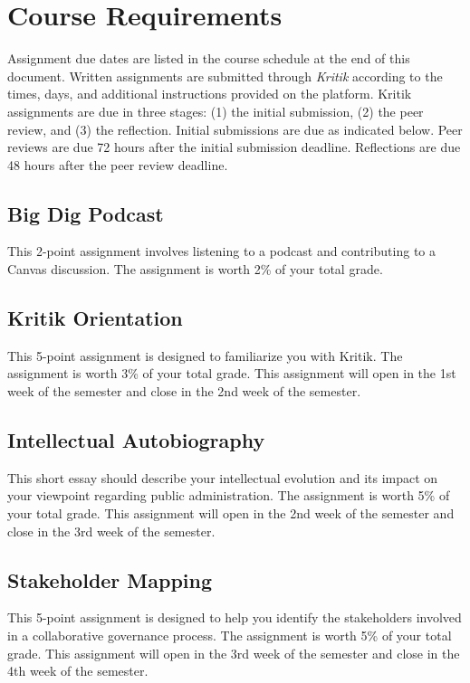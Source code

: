 \documentclass[12pt, letterpaper]{article}
\begin{document}
\section*{Course Requirements}

Assignment due dates are listed in the course schedule at the end of this document. Written assignments are submitted through \emph{Kritik} according to the times, days, and additional instructions provided on the platform. Kritik assignments are due in three stages: (1) the initial submission, (2) the peer review, and (3) the reflection. Initial submissions are due as indicated below. Peer reviews are due 72 hours after the initial submission deadline. Reflections are due 48 hours after the peer review deadline.

\subsection*{Big Dig Podcast}

This 2-point assignment involves listening to a podcast and contributing to a Canvas discussion. The assignment is worth 2\% of your total grade.

\subsection*{Kritik Orientation}

This 5-point assignment is designed to familiarize you with Kritik. The assignment is worth 3\% of your total grade. This assignment will open in the 1st week of the semester and close in the 2nd week of the semester.
 
\subsection*{Intellectual Autobiography}

This short essay should describe your intellectual evolution and its impact on your viewpoint regarding public administration. The assignment is worth 5\% of your total grade. This assignment will open in the 2nd week of the semester and close in the 3rd week of the semester.
 
\subsection*{Stakeholder Mapping}

This 5-point assignment is designed to help you identify the stakeholders involved in a collaborative governance process. The assignment is worth 5\% of your total grade. This assignment will open in the 3rd week of the semester and close in the 4th week of the semester.
\end{document}
